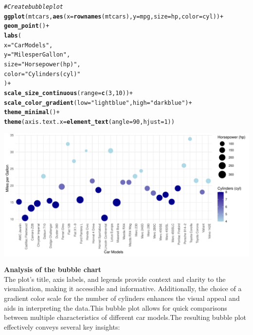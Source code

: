 \documentclass{article}\usepackage[]{graphicx}\usepackage[]{xcolor}
\makeatletter
\def\maxwidth{ %
  \ifdim\Gin@nat@width>\linewidth
    \linewidth
  \else
    \Gin@nat@width
  \fi
}
\newcommand{\hlnum}[1]{\textcolor[rgb]{0.686,0.059,0.569}{#1}}%
\newcommand{\hlstr}[1]{\textcolor[rgb]{0.192,0.494,0.8}{#1}}%
\newcommand{\hlcom}[1]{\textcolor[rgb]{0.678,0.584,0.686}{\textit{#1}}}%
\newcommand{\hlopt}[1]{\textcolor[rgb]{0,0,0}{#1}}%
\newcommand{\hlstd}[1]{\textcolor[rgb]{0.345,0.345,0.345}{#1}}%
\newcommand{\hlkwc}[1]{\textcolor[rgb]{0.333,0.667,0.333}{#1}}%
\newcommand{\hlkwd}[1]{\textcolor[rgb]{0.737,0.353,0.396}{\textbf{#1}}}%
\newenvironment{kframe}{%
 \def\at@end@of@kframe{}%
 \ifinner\ifhmode%
  \def\at@end@of@kframe{\end{minipage}}%
  \begin{minipage}{\columnwidth}%
 \fi\fi%
 \def\FrameCommand##1{\hskip\@totalleftmargin \hskip-\fboxsep
 \colorbox{shadecolor}{##1}\hskip-\fboxsep
     \hskip-\linewidth \hskip-\@totalleftmargin \hskip\columnwidth}%
 \MakeFramed {\advance\hsize-\width
   \@totalleftmargin\z@ \linewidth\hsize
   \@setminipage}}%
 {\par\unskip\endMakeFramed%
 \at@end@of@kframe}
\newenvironment{knitrout}{}{} %
\makeatother
\begin{document}
\begin{knitrout}\scriptsize
{}\color{fgcolor}\begin{kframe}
\begin{alltt}
\hlcom{#Create bubble plot }
\hlkwd{ggplot}\hlstd{(mtcars,} \hlkwd{aes}\hlstd{(}\hlkwc{x} \hlstd{=} \hlkwd{rownames}\hlstd{(mtcars),} \hlkwc{y} \hlstd{= mpg,} \hlkwc{size} \hlstd{= hp,} \hlkwc{color} \hlstd{= cyl))} \hlopt{+}
  \hlkwd{geom_point}\hlstd{()} \hlopt{+}
  \hlkwd{labs}\hlstd{(}
    \hlkwc{x} \hlstd{=} \hlstr{"Car Models"}\hlstd{,}
    \hlkwc{y} \hlstd{=} \hlstr{"Miles per Gallon"}\hlstd{,}
    \hlkwc{size} \hlstd{=} \hlstr{"Horsepower (hp)"}\hlstd{,}
    \hlkwc{color} \hlstd{=} \hlstr{"Cylinders (cyl)"}
  \hlstd{)} \hlopt{+}
  \hlkwd{scale_size_continuous}\hlstd{(}\hlkwc{range} \hlstd{=} \hlkwd{c}\hlstd{(}\hlnum{3}\hlstd{,} \hlnum{10}\hlstd{))} \hlopt{+}
  \hlkwd{scale_color_gradient}\hlstd{(}\hlkwc{low} \hlstd{=} \hlstr{"lightblue"}\hlstd{,} \hlkwc{high} \hlstd{=} \hlstr{"darkblue"}\hlstd{)} \hlopt{+}
  \hlkwd{theme_minimal}\hlstd{()} \hlopt{+}
  \hlkwd{theme}\hlstd{(}\hlkwc{axis.text.x} \hlstd{=} \hlkwd{element_text}\hlstd{(}\hlkwc{angle} \hlstd{=} \hlnum{90}\hlstd{,} \hlkwc{hjust} \hlstd{=}\hlnum{1}\hlstd{))}
\end{alltt}
\end{kframe}

{\centering \includegraphics[width=\maxwidth]{figure/beamer-buble-plot-chunk-1} 

}


\end{knitrout}

\textbf{Analysis of the bubble chart}\\

\noindent
The plot's title, axis labels, and legends provide context and clarity to the visualisation, making it accessible and informative. Additionally, the choice of a gradient color scale for the number of cylinders enhances the visual appeal and aids in interpreting the data.This bubble plot allows for quick comparisons between multiple characteristics of different car models.The resulting bubble plot effectively conveys several key insights:
\end{document}

